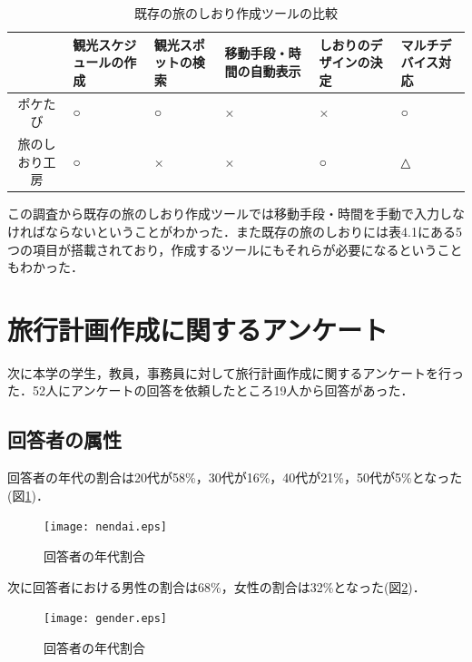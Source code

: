 \documentclass{funthesis}
\begin{document}
\begin{table}[htb]
\begin{center}
\caption{既存の旅のしおり作成ツールの比較}
  \begin{tabular}{|c|p{2.0cm}|p{2.0cm}|p{2.0cm}|p{2.0cm}|p{2.0cm}|} \hline
     & 観光スケジュールの作成 & 観光スポットの検索 & 移動手段・時間の自動表示 & しおりのデザインの決定 & マルチデバイス対応 \\ \hline 
    ポケたび & ○ & ○ & × & × & ○ \\ \hline
    旅のしおり工房 & ○ & × & × & ○ & △\\ \hline
  \end{tabular}
  \end{center}
\end{table}


この調査から既存の旅のしおり作成ツールでは移動手段・時間を手動で入力しなければならないということがわかった．また既存の旅のしおりには表4.1にある5つの項目が搭載されており，作成するツールにもそれらが必要になるということもわかった．\\



\section{旅行計画作成に関するアンケート}
次に本学の学生，教員，事務員に対して旅行計画作成に関するアンケートを行った．52人にアンケートの回答を依頼したところ19人から回答があった．\\

\subsection{回答者の属性}
回答者の年代の割合は20代が58\%，30代が16\%，40代が21\%，50代が5\%となった(図\ref{Lnendai})．

\begin{figure}[htpb]
\begin{center}
\texttt{[image: nendai.eps]}
\end{center}
\caption{回答者の年代割合}
\label{Lnendai}
\end{figure}

\clearpage

次に回答者における男性の割合は68\%，女性の割合は32\%となった(図\ref{Lgender})．

\begin{figure}[htpb]
\begin{center}
\texttt{[image: gender.eps]}
\end{center}
\caption{回答者の年代割合}
\label{Lgender}
\end{figure}
\end{document}
